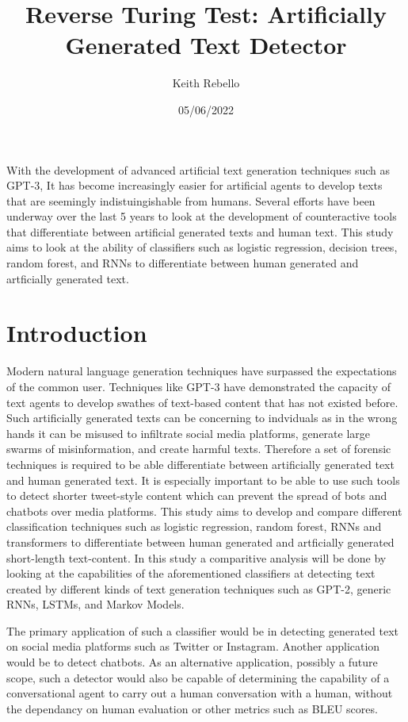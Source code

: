 \documentclass[12pt]{article}
\title{Reverse Turing Test: Artificially Generated Text Detector}
\author{Keith Rebello}
\date{05/06/2022}
\begin{document}
\maketitle

\abstract
With the development of advanced artificial text generation techniques such as GPT-3, It has become increasingly easier for artificial agents to develop texts that are seemingly indistuingishable from humans. Several efforts have been underway over the last 5 years to look at the development of counteractive tools that differentiate between artificial generated texts and human text. This study aims to look at the ability of classifiers such as logistic regression, decision trees, random forest, and RNNs to differentiate between human generated and artficially generated text. 

\section{Introduction}
Modern natural language generation techniques have surpassed the expectations of the common user. Techniques like GPT-3 have demonstrated the capacity of text agents to develop swathes of text-based content that has not existed before. Such artificially generated texts can be concerning to indviduals as in the wrong hands it can be misused to infiltrate social media platforms, generate large swarms of misinformation, and create harmful texts. Therefore a set of forensic techniques is required to be able differentiate between artificially generated text and human generated text. It is especially important to be able to use such tools to detect shorter tweet-style content which can prevent the spread of bots and chatbots over media platforms. This study aims to develop and compare different classification techniques such as logistic regression, random forest, RNNs and transformers to differentiate between human generated and artficially generated short-length text-content. In this study a comparitive analysis will be done by looking at the capabilities of the aforementioned classifiers at detecting text created by different kinds of text generation techniques such as GPT-2, generic RNNs, LSTMs, and Markov Models.

The primary application of such a classifier would be in detecting generated text on social media platforms such as Twitter or Instagram. Another application would be to detect chatbots. As an alternative application, possibly a future scope, such a detector would also be capable of determining the capability of a conversational agent to carry out a human conversation with a human, without the dependancy on human evaluation or other metrics such as BLEU scores.
\end{document}
